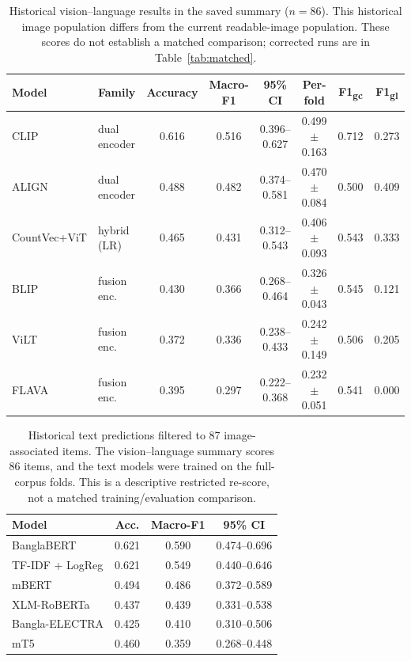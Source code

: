 \documentclass[11pt]{article}
\begin{document}
\begin{table}[ht]
\footnotesize
\centering
\caption{Historical vision--language results in the saved summary ($n=86$). This historical image population differs from the current readable-image population. These scores do not establish a matched comparison; corrected runs are in Table~\ref{tab:matched}.}
\begin{tabular}{|l|l|c|c|c|c|c|c|}
\hline
\textbf{Model} & \textbf{Family} & \textbf{Accuracy} & \textbf{Macro-F1} & \textbf{95\% CI} & \textbf{Per-fold} & \textbf{F1\textsubscript{gc}} & \textbf{F1\textsubscript{gl}} \\
\hline
CLIP          & dual encoder  & 0.616 & 0.516 & 0.396--0.627 & 0.499 $\pm$ 0.163 & 0.712 & 0.273 \\
ALIGN         & dual encoder  & 0.488 & 0.482 & 0.374--0.581 & 0.470 $\pm$ 0.084 & 0.500 & 0.409 \\
CountVec+ViT  & hybrid (LR)  & 0.465 & 0.431 & 0.312--0.543 & 0.406 $\pm$ 0.093 & 0.543 & 0.333 \\
BLIP          & fusion enc.   & 0.430 & 0.366 & 0.268--0.464 & 0.326 $\pm$ 0.043 & 0.545 & 0.121 \\
ViLT          & fusion enc.   & 0.372 & 0.336 & 0.238--0.433 & 0.242 $\pm$ 0.149 & 0.506 & 0.205 \\
FLAVA         & fusion enc.   & 0.395 & 0.297 & 0.222--0.368 & 0.232 $\pm$ 0.051 & 0.541 & 0.000 \\
\hline
\end{tabular}
\label{tab:multimodal_models}
\end{table}

\begin{table}[ht]
\footnotesize
\setlength{\tabcolsep}{3pt}
\centering
\caption{Historical text predictions filtered to 87 image-associated items. The vision--language summary scores 86 items, and the text models were trained on the full-corpus folds. This is a descriptive restricted re-score, not a matched training/evaluation comparison.}
\begin{tabular}{|l|c|c|c|}
\hline
\textbf{Model} & \textbf{Acc.} & \textbf{Macro-F1} & \textbf{95\% CI} \\
\hline
BanglaBERT      & 0.621 & 0.590 & 0.474--0.696 \\
TF-IDF + LogReg & 0.621 & 0.549 & 0.440--0.646 \\
mBERT           & 0.494 & 0.486 & 0.372--0.589 \\
XLM-RoBERTa     & 0.437 & 0.439 & 0.331--0.538 \\
Bangla-ELECTRA  & 0.425 & 0.410 & 0.310--0.506 \\
mT5             & 0.460 & 0.359 & 0.268--0.448 \\
\hline
\end{tabular}
\label{tab:text_on_image_subset}
\end{table}
\end{document}
